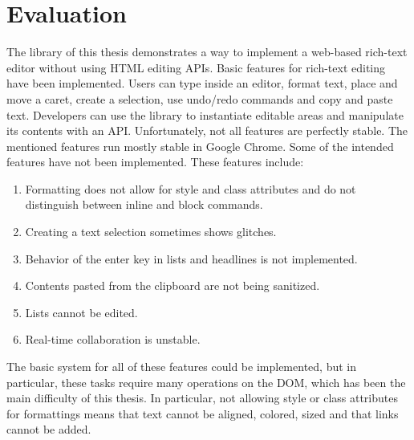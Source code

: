 
\chapter{Evaluation}
\label{ch:evaluation}

The library of this thesis demonstrates a way to implement a web-based rich-text editor without using HTML editing APIs.
Basic features for rich-text editing have been implemented. Users can type inside an editor, format text, place and move a caret, create a selection, use undo/redo commands and copy and paste text. Developers can use the library to instantiate editable areas and manipulate its contents with an API. Unfortunately, not all features are perfectly stable. The mentioned features run mostly stable in Google Chrome. Some of the intended features have not been implemented. These features include:

\begin{enumerate}
\item Formatting does not allow for style and class attributes and do not distinguish between inline and block commands.
\item Creating a text selection sometimes shows glitches.
\item Behavior of the enter key in lists and headlines is not implemented.
\item Contents pasted from the clipboard are not being sanitized.
\item Lists cannot be edited.
\item Real-time collaboration is unstable.
\end{enumerate}

The basic system for all of these features could be implemented, but in particular, these tasks require many operations on the DOM, which has been the main difficulty of this thesis. In particular, not allowing style or class attributes for formattings means that text cannot be aligned, colored, sized and that links cannot be added.



